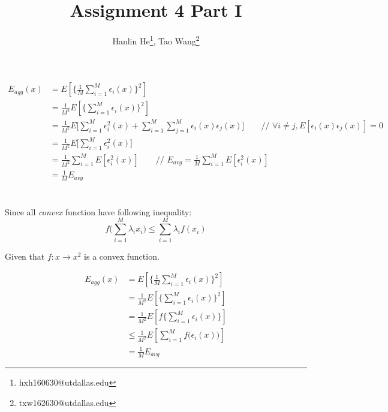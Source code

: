 \documentclass[12pt, letterpaper]{article}
\title{Assignment 4 Part I}
\author{Hanlin He\footnote{hxh160630@utdallas.edu},
Tao Wang\footnote{txw162630@utdallas.edu}}
\begin{document}
\maketitle

\section{}

\begin{align*}
E_{agg}(x) &= E\left[\bigg\{\frac{1}{M}\sum_{i=1}^M\epsilon_i(x)\bigg\}^2\right]\\
&= \frac{1}{M^2}E\left[\bigg\{\sum_{i=1}^M\epsilon_i(x)\bigg\}^2\right]\\
&= \frac{1}{M^2}E\bigg[\sum_{i=1}^M\epsilon_i^2(x)+\sum_{i=1}^M\sum_{j=1}^M\epsilon_i(x)\epsilon_j(x)\bigg]\qquad\text{// }\forall i\neq j,E[\epsilon_i(x)\epsilon_j(x)]=0\\
&= \frac{1}{M^2}E\bigg[\sum_{i=1}^M\epsilon_i^2(x)\bigg]\\
&= \frac{1}{M^2}\sum_{i=1}^ME[\epsilon_i^2(x)]\qquad\text{// }E_{avg}=\frac{1}{M}\sum_{i=1}^ME[\epsilon_i^2(x)]\\
&= \frac{1}{M}E_{avg}
\end{align*}

\section{}

Since all \emph{convex} function have following inequality:
\[f\bigg(\sum_{i=1}^M\lambda_ix_i\bigg)\leq\sum_{i=1}^M\lambda_if(x_i)\]

Given that $f: x \rightarrow x^2$ is a convex function.

\begin{align*}
E_{agg}(x) &= E\left[\bigg\{\frac{1}{M}\sum_{i=1}^M\epsilon_i(x)\bigg\}^2\right]\\
&= \frac{1}{M^2}E\left[\bigg\{\sum_{i=1}^M\epsilon_i(x)\bigg\}^2\right]\\
&= \frac{1}{M^2}E\left[f\bigg\{\sum_{i=1}^M\epsilon_i(x)\bigg\}\right]\\
&\leq \frac{1}{M^2}E\left[\sum_{i=1}^Mf\big(\epsilon_i(x)\big)\right]\\
&= \frac{1}{M}E_{avg}
\end{align*}
\end{document}
